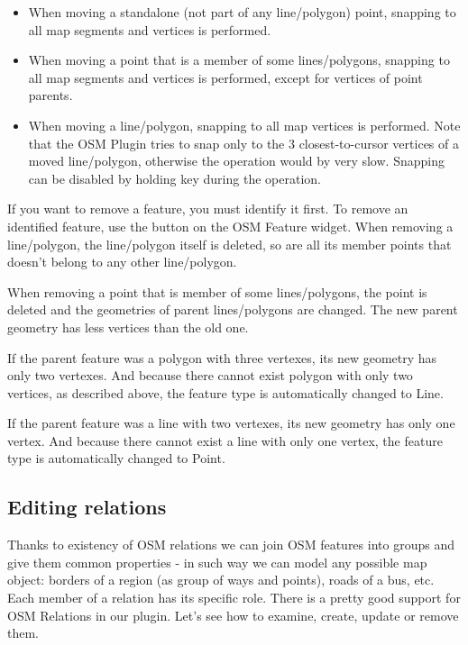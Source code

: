 \begin{itemize}
\item When moving a standalone (not part of any line/polygon) point, 
snapping to all map segments and vertices is performed.
\item When moving a point that is a member of some lines/polygons, 
snapping to all map segments and vertices is performed, except for 
vertices of point parents.
\item When moving a line/polygon, snapping to all map vertices is performed. 
Note that the OSM Plugin tries to snap only to the 3 closest-to-cursor 
vertices of a moved line/polygon, otherwise the operation would by very slow.
Snapping can be disabled by holding  key during the operation.
\end{itemize}


If you want to remove a feature, you must identify it first. To remove 
an identified feature, use the  button on the OSM Feature widget. When removing a line/polygon, 
the line/polygon itself is deleted, so are all its member points that 
doesn't belong to any other line/polygon. 

When removing a point that is member of some lines/polygons, the point is 
deleted and the geometries of parent lines/polygons are changed. The new 
parent geometry has less vertices than the old one.

If the parent feature was a polygon with three vertexes, its new geometry 
has only two vertexes. And because there cannot exist polygon with only two 
vertices, as described above, the feature type is automatically changed to 
Line.

If the parent feature was a line with two vertexes, its new geometry has 
only one vertex. And because there cannot exist a line with only one vertex, 
the feature type is automatically changed to Point.

\subsection{Editing relations}\label{editing_osm_relation}

Thanks to existency of OSM relations we can join OSM features into groups and
give them common properties - in such way we can model any possible map
object: borders of a region (as group of ways and points), roads of a bus,
etc. Each member of a relation has its specific role. There is a pretty good 
support for OSM Relations in our plugin. Let's see how to examine, create, 
update or remove them.

